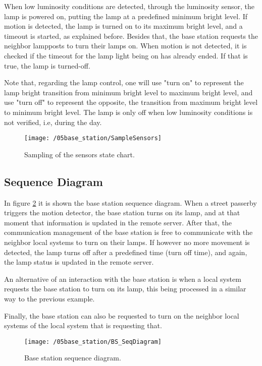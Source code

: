 When low luminosity conditions are detected, through the luminosity sensor, the lamp is powered on, putting the lamp at a predefined minimum bright level. If motion is detected, the lamp is turned on to its maximum bright level, and a timeout is started, as explained before. Besides that, the base station requests the neighbor lampposts to turn their lamps on. When motion is not detected, it is checked if the timeout for the lamp light being on has already ended. If that is true, the lamp is turned-off.

Note that, regarding the lamp control, one will use "turn on" to represent the lamp bright transition from minimum bright level to maximum bright level, and use "turn off" to represent the opposite, the transition from maximum bright level to minimum bright level. The lamp is only off when low luminosity conditions is not verified, i.e, during the day.

\begin{figure}[ht]
	\centering
	\texttt{[image: /05base\_station/SampleSensors]}
	\caption{Sampling of the sensors state chart.}
	\label{fig:sample_sensors}
\end{figure}

\clearpage
\subsection{Sequence Diagram}
In figure \ref{fig:bs_seq_diagram} it is shown the base station sequence diagram. When a street passerby triggers the motion detector, the base station turns on its lamp, and at that moment that information is updated in the remote server. After that, the communication management of the base station is free to communicate with the neighbor local systems to turn on their lamps. If however no more movement is detected, the lamp turns off after a predefined time (turn off time), and again, the lamp status is updated in the remote server.

An alternative of an interaction with the base station is when a local system requests the base station to turn on its lamp, this being processed in a similar way to the previous example.

Finally, the base station can also be requested to turn on the neighbor local systems of the local system that is requesting that.
\begin{figure}[ht]
	\centering
	\texttt{[image: /05base\_station/BS\_SeqDiagram]}
	\caption{Base station sequence diagram.}
	\label{fig:bs_seq_diagram}
\end{figure}